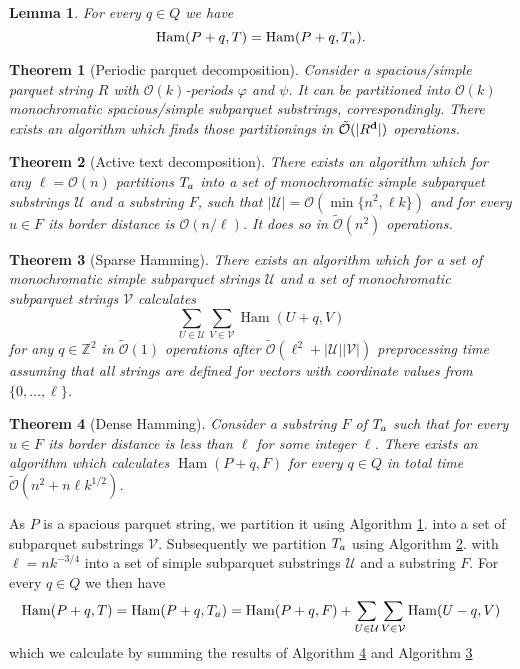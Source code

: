 \documentclass[11pt]{article}
\newcommand{\Z}{\mathbb{Z}}
\renewcommand{\O}{\mathcal{O}}
\newcommand{\tO}{\tilde{\mathcal{O}}}
\renewcommand{\phi}{\varphi}
\newcommand{\set}[1]{\lbrace #1 \rbrace}
\DeclareMathOperator*{\Ham}{Ham}
\theoremstyle{plain}
\newtheorem{theorem}{Theorem}
\newtheorem{lemma}{Lemma}
\theoremstyle{definition}
\begin{document}
\begin{lemma}
	For every $q \in Q$ we have
	$$ \Ham(P + q, T) = \Ham(P + q, \Ta).$$
\end{lemma}


\begin{theorem}[Periodic parquet decomposition]
	\label{parquet_decomposition}
	Consider a spacious/simple parquet string $R$ with $\O(k)$-periods $\phi$ and $\psi$.
	It can be partitioned into $\O(k)$ monochromatic spacious/simple subparquet substrings, correspondingly.
	There exists an algorithm which finds those partitionings in $\tO(|\d{R}|)$ operations.
\end{theorem}


\newcommand{\T}{\mathcal{T}}
\renewcommand{\S}{\mathcal{S}}
\renewcommand{\P}{\mathcal{P}}
\newcommand{\U}{\mathcal{U}}
\newcommand{\V}{\mathcal{V}}
\newcommand{\F}{\mathcal{F}}

\begin{theorem}[Active text decomposition]
	\label{text_decomposition}
	There exists an algorithm which for any $\ell = \O(n)$ partitions $T_a$ into a set of monochromatic simple subparquet substrings $\U$ and a substring $F$,
	such that $|\U| = \O(\min\set{n^2, \ell k})$ and for every $u \in F$ its border distance is $\O(n / \ell)$.
	It does so in $\tO(n^2)$ operations.
\end{theorem}


\begin{theorem}[Sparse Hamming]
	\label{sparse_algo}
	There exists an algorithm which for a set of monochromatic simple subparquet strings $\U$ and a set of monochromatic subparquet strings $\V$ calculates 
	$$ \sum_{U \in \U}\sum_{V \in \V} \Ham(U + q, V) $$
	for any $q \in \Z^2 $ in $\tO(1)$ operations after $\tO(\ell^2 + |\U||\V|)$ preprocessing time assuming that all strings are defined for vectors with coordinate values from $\set{0, \dots, \ell}$.
\end{theorem}


\begin{theorem}[Dense Hamming]
	\label{dense_algo}
	Consider a substring $F$ of $T_a$ such that for every $u \in F$ its border distance is less than $\ell$ for some integer $\ell$.
	There exists an algorithm which calculates $\Ham(P + q, F)$ for every $q \in Q$ in total time $\tO(n^2 + n \ell k^{1/2})$.
\end{theorem}


As $P$ is a spacious parquet string, we partition it using Algorithm \ref{parquet_decomposition}. into a set of subparquet substrings $\V$.
Subsequently we partition $T_a$ using Algorithm \ref{text_decomposition}. with $\ell = nk^{-3/4}$ into a set of simple subparquet substrings $\U$ and a substring $F$.
For every $q \in Q$ we then have
$$ \Ham(P + q, T) = \Ham(P + q, \Ta) = \Ham(P + q, F) + \sum_{U \in \U}\sum_{V \in \V} \Ham(U - q, V) $$
which we calculate by summing the results of Algorithm \ref{dense_algo} and Algorithm \ref{sparse_algo}
\end{document}
